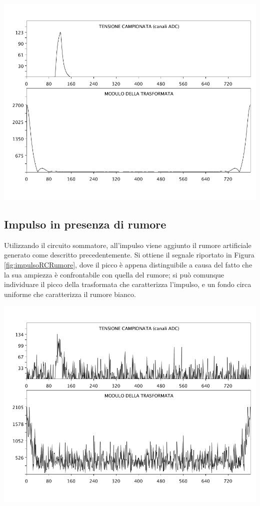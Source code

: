 \documentclass[10pt,oneside,a4paper]{article}
\newenvironment{Figure}
  {\par\medskip\noindent\minipage{\linewidth}}
  {\endminipage\par\medskip}
\begin{document}
\begin{multicols}{2}
\begin{Figure}
\begin{center}
	\includegraphics[width=0.9\linewidth]{impulsoRCSommatoreFiltro.png}
	\label{fig:impulsoRCSommatoreFiltro}
	\end{center}
\end{Figure}

\subsection{Impulso in presenza di rumore}
Utilizzando il circuito sommatore, all'impulso viene aggiunto il rumore artificiale generato come descritto precedentemente. Si ottiene il segnale riportato in Figura \ref{fig:impulsoRCRumore}, dove il picco è appena distinguibile a causa del fatto che la sua ampiezza è confrontabile con quella del rumore; si può comunque individuare il picco della trasformata che caratterizza l'impulso, e un fondo circa uniforme che caratterizza il rumore bianco.
\begin{Figure}
	\begin{center}
	\includegraphics[width=0.9\linewidth]{impulsoRCRumore}
	\label{fig:impulsoRCRumore}
	\end{center}
\end{Figure}


\end{multicols}
\end{document}
